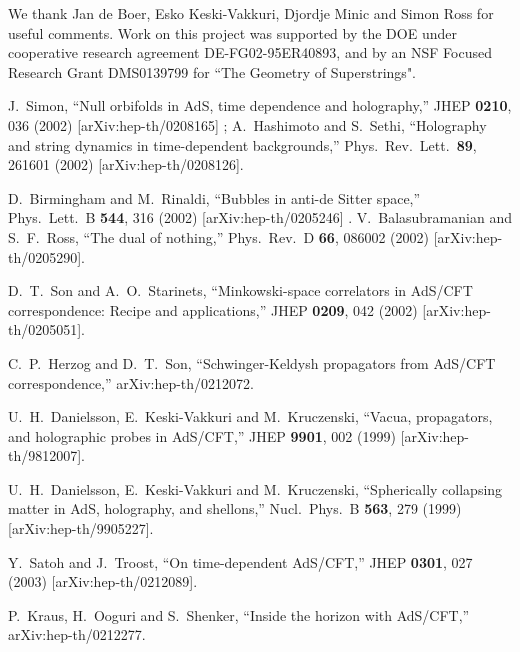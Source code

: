 \documentclass[a4paper,aps,prd,preprintnumbers,groupedaddress]{revtex4}
\begin{document}
\begin{acknowledgments}
We thank Jan de Boer, Esko Keski-Vakkuri, Djordje Minic and Simon Ross for useful comments.
Work on this project was supported by the DOE under cooperative research agreement DE-FG02-95ER40893, and by an NSF Focused Research Grant DMS0139799 for ``The Geometry of
Superstrings".
\end{acknowledgments}

\begin{references}
J.~Simon,
``Null orbifolds in AdS, time dependence and holography,''
JHEP {\bf 0210}, 036 (2002)
[arXiv:hep-th/0208165]
;
A.~Hashimoto and S.~Sethi,
``Holography and string dynamics in time-dependent backgrounds,''
Phys.\ Rev.\ Lett.\  {\bf 89}, 261601 (2002)
[arXiv:hep-th/0208126].

D.~Birmingham and M.~Rinaldi, ``Bubbles in anti-de Sitter space,''
Phys.\ Lett.\ B {\bf 544}, 316 (2002) [arXiv:hep-th/0205246]
.
V.~Balasubramanian and S.~F.~Ross, ``The dual of nothing,'' Phys.\ Rev.\ D {\bf 66}, 086002 (2002) [arXiv:hep-th/0205290].


D.~T.~Son and A.~O.~Starinets, ``Minkowski-space correlators in AdS/CFT correspondence: Recipe and  applications,'' JHEP {\bf 0209}, 042
(2002) [arXiv:hep-th/0205051].


 C.~P.~Herzog and D.~T.~Son,
``Schwinger-Keldysh propagators from AdS/CFT correspondence,'' arXiv:hep-th/0212072.


U.~H.~Danielsson, E.~Keski-Vakkuri and M.~Kruczenski, ``Vacua, propagators, and holographic probes in AdS/CFT,'' JHEP {\bf 9901}, 002 (1999)
[arXiv:hep-th/9812007].


U.~H.~Danielsson, E.~Keski-Vakkuri and M.~Kruczenski,
``Spherically collapsing matter in AdS, holography, and shellons,''
Nucl.\ Phys.\ B {\bf 563}, 279 (1999)
[arXiv:hep-th/9905227].


 Y.~Satoh and J.~Troost,
``On time-dependent AdS/CFT,'' JHEP {\bf 0301}, 027 (2003) [arXiv:hep-th/0212089].



 P.~Kraus, H.~Ooguri and S.~Shenker,
``Inside the horizon with AdS/CFT,'' arXiv:hep-th/0212277.



\end{references}
\end{document}
